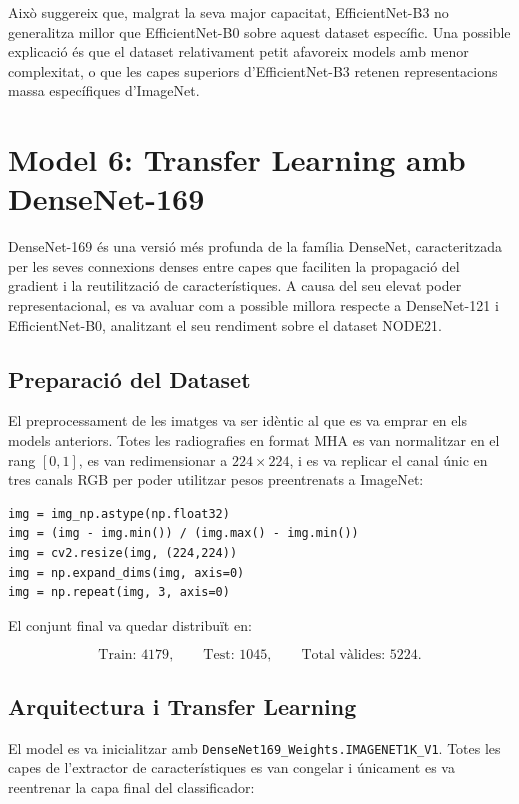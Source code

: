 \documentclass[12pt,a4paper]{article}
\begin{document}
Això suggereix que, malgrat la seva major capacitat, EfficientNet-B3 no generalitza millor que
EfficientNet-B0 sobre aquest dataset específic. Una possible explicació és que el
dataset relativament petit afavoreix models amb menor complexitat, o que les capes
superiors d’EfficientNet-B3 retenen representacions massa específiques d’ImageNet.


\section{Model 6: Transfer Learning amb DenseNet-169}

DenseNet-169 és una versió més profunda de la família DenseNet, caracteritzada per les seves
connexions denses entre capes que faciliten la propagació del gradient i la reutilització
de característiques. A causa del seu elevat poder representacional, es va avaluar com a possible
millora respecte a DenseNet-121 i EfficientNet-B0, analitzant el seu rendiment sobre el
dataset NODE21.

\subsection{Preparació del Dataset}

El preprocessament de les imatges va ser idèntic al que es va emprar en els models anteriors.
Totes les radiografies en format MHA es van normalitzar en el rang $[0,1]$, es van
redimensionar a $224 \times 224$, i es va replicar el canal únic en tres canals RGB per
poder utilitzar pesos preentrenats a ImageNet:

\begin{lstlisting}[style=mypython]
img = img_np.astype(np.float32)
img = (img - img.min()) / (img.max() - img.min())
img = cv2.resize(img, (224,224))
img = np.expand_dims(img, axis=0)
img = np.repeat(img, 3, axis=0)
\end{lstlisting}

El conjunt final va quedar distribuït en:

\[
\text{Train: }4179, \qquad
\text{Test: }1045, \qquad
\text{Total vàlides: }5224.
\]

\subsection{Arquitectura i Transfer Learning}

El model es va inicialitzar amb \texttt{DenseNet169\_Weights.IMAGENET1K\_V1}. Totes les capes
de l’extractor de característiques es van congelar i únicament es va reentrenar la capa final
del classificador:
\end{document}
